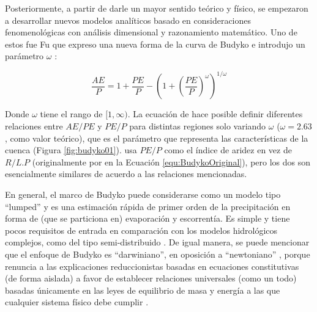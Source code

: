 \documentclass[12pt]{article}
\begin{document}
\thispagestyle{empty}

Posteriormente, a partir de darle un mayor sentido teórico y físico, se empezaron a desarrollar nuevos modelos analíticos basado en consideraciones fenomenológicas con análisis dimensional y razonamiento matemático. Uno de estos fue Fu \citep{Fu1981} que expreso una nueva forma de la curva de Budyko e introdujo un parámetro $\omega$ \citep{Zhang2004}: 

\begin{equation}
\frac{AE}{P} = 1 + \frac{PE}{P} - \left (1 + \left ( \frac{PE}{P} \right )^{\omega}  \right )^{1/\omega}
\label{equ:fuEqu}
\end{equation}

Donde $\omega$ tiene el rango de $[1,\infty)$. La ecuación de \citet{Fu1981} hace posible definir diferentes relaciones entre $AE/PE$ y $PE/P$ para distintas regiones solo variando $\omega$ ($\omega = 2.63$, como valor teórico), que es el parámetro que representa las características de la cuenca (Figura \ref{fig:budyko01}). \citet{Fu1981} usa $PE/P$ como el índice de aridez en vez de $R/L.P$ (originalmente por \citet{budyko1958heat} en la Ecuación \ref{equ:BudykoOriginal}), pero los dos son esencialmente similares de acuerdo a las relaciones mencionadas.

\vspace*{.5cm}

\thispagestyle{empty}

En general, el marco de Budyko puede considerarse como un modelo tipo “lumped” y es una estimación rápida de primer orden de la precipitación en forma de (que se particiona en) evaporación y escorrentía. Es simple y tiene pocos requisitos de entrada en comparación con los modelos hidrológicos complejos, como del tipo semi-distribuido \citep{mianabadi2020budyko}. De igual manera, se puede mencionar que el enfoque de Budyko es “darwiniano”, en oposición a “newtoniano” \citep{wang2016advances}, porque renuncia a las explicaciones reduccionistas basadas en ecuaciones constitutivas (de forma aislada) a favor de establecer relaciones universales (como un todo) basadas únicamente en las leyes de equilibrio de masa y energía a las que cualquier sistema físico debe cumplir \citep{sposito2017understanding}.
\end{document}

